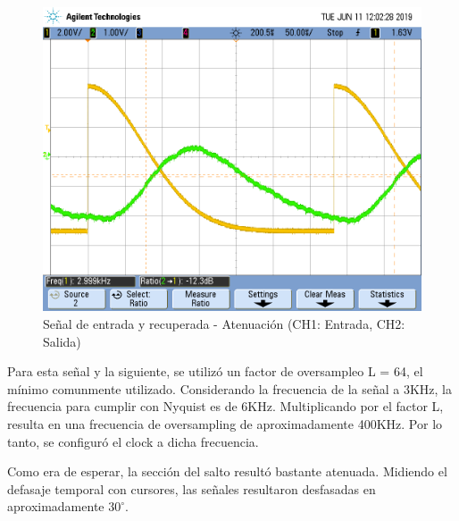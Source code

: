 \documentclass[assd_tp3_main.tex]{subfiles}
\begin{document}
\begin{figure}[!ht]
\begin{centering}
\includegraphics[scale=0.25]{../EJ4/Mediciones/0.5Gauss/s2_1a.png}
\par\end{centering}
\caption{Señal de entrada y recuperada - Atenuación (CH1: Entrada, CH2: Salida)}
\end{figure}

Para esta señal y la siguiente, se utilizó un factor de oversampleo L = 64, el mínimo comunmente utilizado. Considerando la frecuencia de la señal a 3KHz, la frecuencia para cumplir con Nyquist es de 6KHz. Multiplicando por el factor L, resulta en una frecuencia de oversampling de aproximadamente 400KHz. Por lo tanto, se configuró el clock a dicha frecuencia.\par
Como era de esperar, la sección del salto resultó bastante atenuada. Midiendo el defasaje temporal con cursores, las señales resultaron desfasadas en aproximadamente $30^{\circ}$.
\end{document}
